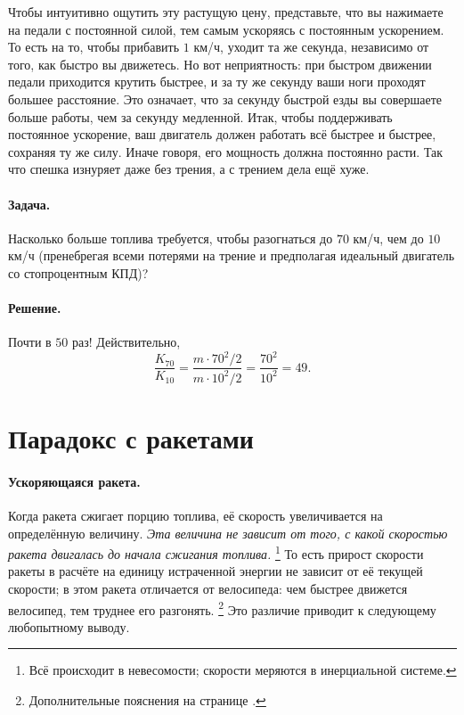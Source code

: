 Чтобы интуитивно ощутить эту растущую цену, представьте, что вы нажимаете на педали с постоянной силой, тем самым ускоряясь с постоянным ускорением.
То есть на то, чтобы прибавить $1$ км/ч, уходит та же секунда, независимо от того, как быстро вы движетесь.
Но вот неприятность: при быстром движении педали приходится крутить быстрее, и за ту же секунду ваши ноги проходят большее расстояние.
Это означает, что за секунду быстрой езды вы совершаете больше работы, чем за секунду медленной.
Итак, чтобы поддерживать постоянное ускорение, ваш двигатель должен работать всё быстрее и быстрее, сохраняя ту же силу.
Иначе говоря, его мощность должна постоянно расти.
Так что спешка изнуряет даже без трения, а с трением дела ещё хуже.

\paragraph{Задача.}
Насколько больше топлива требуется,
чтобы разогнаться до $70$ км/ч, чем до $10$ км/ч
(пренебрегая всеми потерями на трение и предполагая идеальный двигатель со стопроцентным КПД)?

\paragraph{Решение.}
Почти в $50$ раз!
Действительно,
\[
\frac{K_{70}}{K_{10}}
 =\frac{m \cdot 70^2/2}{m \cdot 10^2/2}
 =\frac{70^2}{10^2}
 =49.
\]





\section{Парадокс с ракетами}\label{Парадокс с ракетами}

\paragraph{Ускоряющаяся ракета.}
Когда ракета сжигает порцию топлива, её скорость увеличивается на определённую величину.
\emph{Эта величина не зависит от того, с какой скоростью ракета двигалась до начала сжигания топлива.}%
\footnote{Всё происходит в невесомости; скорости меряются в инерциальной системе.}
То есть прирост скорости ракеты в расчёте на единицу истраченной энергии не зависит от её текущей скорости;
в этом ракета отличается от велосипеда: чем быстрее движется велосипед, тем труднее его разгонять.%
\footnote{Дополнительные пояснения на странице \pageref{Ответ:Как почувствовать квадрат}.}
Это различие приводит к следующему любопытному выводу.

